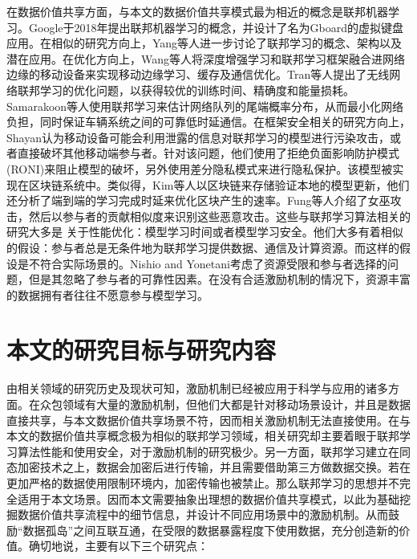 \documentclass[promaster]{thesis-uestc}
\begin{document}
在数据价值共享方面，与本文的数据价值共享模式最为相近的概念是联邦机器学习。Google于2018年提出联邦机器学习的概念，并设计了名为Gboard\cite{hard2018federated}的虚拟键盘应用。在相似的研究方向上，Yang等人进一步讨论了联邦学习的概念、架构以及潜在应用。在优化方向上，Wang等人将深度增强学习和联邦学习框架融合进网络边缘的移动设备来实现移动边缘学习、缓存及通信优化。Tran等人提出了无线网络联邦学习的优化问题，以获得较优的训练时间、精确度和能量损耗。Samarakoon等人使用联邦学习来估计网络队列的尾端概率分布，从而最小化网络负担，同时保证车辆系统之间的可靠低时延通信。在框架安全相关的研究方向上，Shayan认为移动设备可能会利用泄露的信息对联邦学习的模型进行污染攻击，或者直接破坏其他移动端参与者。针对该问题，他们使用了拒绝负面影响防护模式(RONI)来阻止模型的破坏，另外使用差分隐私模式来进行隐私保护。该模型被实现在区块链系统中。类似得，Kim等人以区块链来存储验证本地的模型更新，他们还分析了端到端的学习完成时延来优化区块产生的速率。Fung等人介绍了女巫攻击，然后以参与者的贡献相似度来识别这些恶意攻击。这些与联邦学习算法相关的研究大多是 关于性能优化：模型学习时间或者模型学习安全。他们大多有着相似的假设：参与者总是无条件地为联邦学习提供数据、通信及计算资源\cite{yang2019federated}。而这样的假设是不符合实际场景的。Nishio and Yonetani考虑了资源受限和参与者选择的问题，但是其忽略了参与者的可靠性因素。在没有合适激励机制的情况下，资源丰富的数据拥有者往往不愿意参与模型学习。

\section{本文的研究目标与研究内容}
由相关领域的研究历史及现状可知，激励机制已经被应用于科学与应用的诸多方面。在众包领域有大量的激励机制，但他们大都是针对移动场景设计，并且是数据直接共享，与本文数据价值共享场景不符，因而相关激励机制无法直接使用。在与本文的数据价值共享概念极为相似的联邦学习领域，相关研究却主要着眼于联邦学习算法性能和使用安全，对于激励机制的研究极少。另一方面，联邦学习建立在同态加密技术之上，数据会加密后进行传输，并且需要借助第三方做数据交换。若在更加严格的数据使用限制环境内，加密传输也被禁止。那么联邦学习的思想并不完全适用于本文场景。因而本文需要抽象出理想的数据价值共享模式，以此为基础挖掘数据价值共享流程中的细节信息，并设计不同应用场景中的激励机制。从而鼓励“数据孤岛”之间互联互通，在受限的数据暴露程度下使用数据，充分创造新的价值。确切地说，主要有以下三个研究点：
\end{document}
